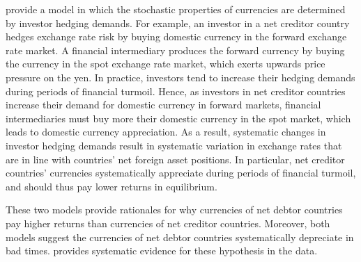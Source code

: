 \documentclass{ar-1col}
\begin{document}
\citet{LiaoZhang2020} provide a model in which the stochastic properties of currencies are determined by investor hedging demands. For example, an investor in a net creditor country hedges exchange rate risk by buying domestic currency in the forward exchange rate market. A financial intermediary produces the forward currency by buying the currency in the spot exchange rate market, which exerts upwards price pressure on the yen. In practice, investors tend to increase their hedging demands during periods of financial turmoil. Hence, as investors in net creditor countries increase their demand for domestic currency in forward markets, financial intermediaries must buy more their domestic currency in the spot market, which leads to domestic currency appreciation. As a result, systematic changes in investor hedging demands result in systematic variation in exchange rates that are in line with countries' net foreign asset positions. In particular, net creditor countries' currencies systematically appreciate during periods of financial turmoil, and should thus pay lower returns in equilibrium.

These two models provide rationales for why currencies of net debtor countries pay higher returns than currencies of net creditor countries. Moreover, both models suggest the currencies of net debtor countries systematically depreciate in bad times. \citet{DellaCorteetal2009} provides systematic evidence for these hypothesis in the data. 
 
\end{document}
